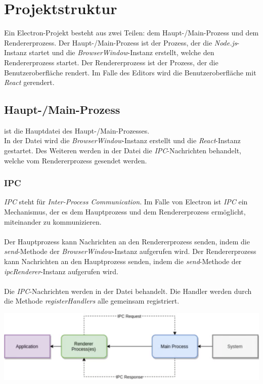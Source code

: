 \section{Projektstruktur}\label{sec:projektstruktur}

Ein Electron-Projekt besteht aus zwei Teilen: dem Haupt-/Main-Prozess und dem Rendererprozess.
Der Haupt-/Main-Prozess ist der Prozess, der die \emph{Node.js}-Instanz startet und die \emph{BrowserWindow}-Instanz erstellt, welche den Rendererprozess startet.
Der Rendererprozess ist der Prozess, der die Benutzeroberfläche rendert.
Im Falle des Editors wird die Benutzeroberfläche mit \emph{React} gerendert.

\subsection{Haupt-/Main-Prozess}\label{subsec:haupt-/main-prozess}

 ist die Hauptdatei des Haupt-/Main-Prozesses.\\
In der Datei  wird die \emph{BrowserWindow}-Instanz erstellt und die \emph{React}-Instanz gestartet.
Des Weiteren werden in der Datei  die \emph{IPC}-Nachrichten behandelt, welche vom Rendererprozess gesendet werden.

\subsubsection{IPC}

\emph{IPC} steht für \emph{Inter-Process Communication}.
Im Falle von Electron ist \emph{IPC} ein Mechanismus, der es dem Hauptprozess und dem Rendererprozess ermöglicht, miteinander zu kommunizieren.
\\\\
Der Hauptprozess kann Nachrichten an den Rendererprozess senden, indem die \emph{send}-Methode der \emph{BrowserWindow}-Instanz aufgerufen wird.
Der Rendererprozess kann Nachrichten an den Hauptprozess senden, indem die \emph{send}-Methode der \emph{ipcRenderer}-Instanz aufgerufen wird.
\\\\
Die \emph{IPC}-Nachrichten werden in der Datei  behandelt.
Die Handler werden durch die Methode \emph{registerHandlers} alle gemeinsam registriert.

\includegraphics[scale=0.5]{assets/ipcresponserequest}

